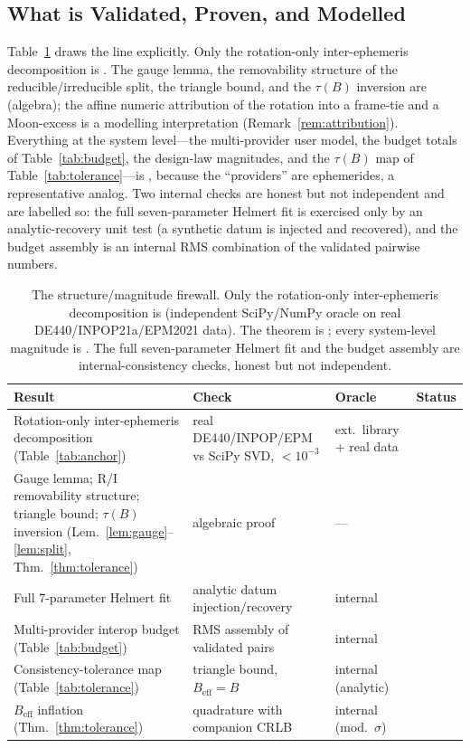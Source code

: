 \subsection{What is Validated, Proven, and Modelled}
\label{sec:matrix}

Table~\ref{tab:honesty} draws the line explicitly. Only the rotation-only
inter-ephemeris decomposition is \Validated{}. The gauge lemma, the removability
structure of the reducible/irreducible split, the triangle bound, and the $\tau(B)$
inversion are \Proven{} (algebra); the affine numeric attribution of the rotation into
a frame-tie and a Moon-excess is a modelling interpretation
(Remark~\ref{rem:attribution}). Everything at the system level---the multi-provider user model,
the budget totals of Table~\ref{tab:budget}, the design-law magnitudes, and the
$\tau(B)$ map of Table~\ref{tab:tolerance}---is \Modelled{}, because the ``providers''
are ephemerides, a representative analog. Two internal checks are honest but not
independent and are labelled so: the full seven-parameter Helmert fit is exercised
only by an analytic-recovery unit test (a synthetic datum is injected and recovered),
and the budget assembly is an internal RMS combination of the validated pairwise
numbers.

\begin{table}[t]
\centering
\caption{The structure/magnitude firewall. Only the rotation-only inter-ephemeris
decomposition is \Validated{} (independent SciPy/NumPy oracle on real
DE440/INPOP21a/EPM2021 data). The theorem is \Proven{}; every system-level magnitude
is \Modelled{}. The full seven-parameter Helmert fit and the budget assembly are
internal-consistency checks, honest but not independent.}
\label{tab:honesty}
\small
\begin{tabular}{@{}p{4.8cm}p{3.6cm}p{2.8cm}c@{}}
\toprule
\textbf{Result} & \textbf{Check} & \textbf{Oracle} & \textbf{Status} \\
\midrule
Rotation-only inter-ephemeris decomposition (Table~\ref{tab:anchor}) &
real DE440/INPOP/EPM vs SciPy SVD, $<\!10^{-3}$ &
ext.\ library + real data & \Validated{} \\[3pt]
Gauge lemma; R/I removability structure; triangle bound; $\tau(B)$ inversion
(Lem.~\ref{lem:gauge}--\ref{lem:split}, Thm.~\ref{thm:tolerance}) &
algebraic proof &
--- & \Proven{} \\[3pt]
Full 7-parameter Helmert fit &
analytic datum injection/recovery &
internal & \Modelled{} \\[3pt]
Multi-provider interop budget (Table~\ref{tab:budget}) &
RMS assembly of validated pairs &
internal & \Modelled{} \\[3pt]
Consistency-tolerance map (Table~\ref{tab:tolerance}) &
triangle bound, $B_{\mathrm{eff}}=B$ &
internal (analytic) & \Modelled{} \\[3pt]
$B_{\mathrm{eff}}$ inflation (Thm.~\ref{thm:tolerance}) &
quadrature with companion CRLB &
internal (mod.\ $\sigma$) & \Modelled{} \\
\bottomrule
\end{tabular}
\end{table}

